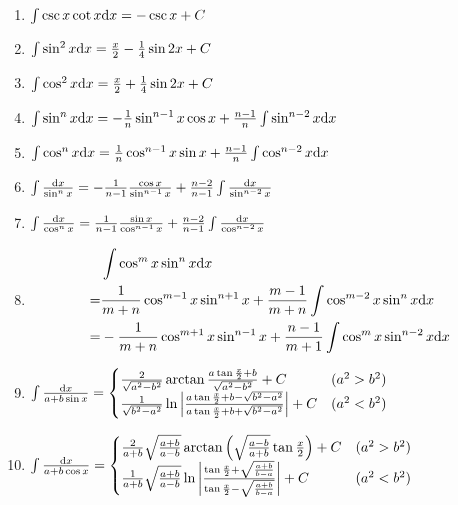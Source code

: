 \begin{footnotesize}
\begin{enumerate}
\item $ \int \csc x \cot x \mathrm{d} x = -\csc x + C $

\item $ \int \sin^2 x \mathrm{d} x = \frac{x}{2} - \frac{1}{4} \sin 2x + C $

\item $ \int \cos^2 x \mathrm{d} x = \frac{x}{2} + \frac{1}{4} \sin 2x + C $

\item $ \int \sin^n x \mathrm{d} x = -\frac{1}{n} \sin^{n-1} x \cos x + \frac{n-1}{n} \int \sin^{n-2} x \mathrm{d} x $

\item $ \int \cos^n x \mathrm{d} x = \frac{1}{n} \cos^{n-1} x \sin x + \frac{n-1}{n} \int \cos^{n-2} x \mathrm{d} x $

\item $ \int \frac{\mathrm{d} x}{\sin^n x} = -\frac{1}{n-1} \frac{\cos x}{\sin^{n-1}x} + \frac{n-2}{n-1} \int \frac{\mathrm{d} x}{\sin^{n-2}x} $

\item $ \int \frac{\mathrm{d} x}{\cos^n x} = \frac{1}{n-1} \frac{\sin x}{\cos^{n-1}x} + \frac{n-2}{n-1} \int \frac{\mathrm{d} x}{\cos^{n-2}x} $

\item \[ \begin{split} {} & \int \cos^m x \sin^n x \mathrm{d} x \\
	= & \frac{1}{m+n} \cos^{m-1} x \sin^{n+1}x + \frac{m-1}{m+n}\int\cos^{m-2}x\sin^nx\mathrm{d} x \\
	= & -\frac{1}{m+n} \cos^{m+1} x \sin^{n-1}x + \frac{n-1}{m+1} \int \cos^m x\sin^{n-2} x \mathrm{d} x \end{split} \]

\item $ \int \frac{\mathrm{d} x}{a + b \sin x} = \begin{cases}
\frac{2}{\sqrt{a^2-b^2}}\arctan\frac{a\tan\frac{x}{2}+b}{\sqrt{a^2-b^2}} + C & (a^2 > b^2) \\
\frac{1}{\sqrt{b^2-a^2}}\ln \left| \frac{a\tan\frac{x}{2}+b-\sqrt{b^2-a^2}}{a\tan\frac{x}{2}+b+\sqrt{b^2-a^2}} \right| + C & (a^2 < b^2)
\end{cases} $

\item $ \int \frac{\mathrm{d} x}{a + b \cos x} = \begin{cases}
\frac{2}{a+b}\sqrt\frac{a+b}{a-b} \arctan\left(\sqrt\frac{a-b}{a+b}\tan\frac{x}{2}\right) + C & (a^2 > b^2) \\
\frac{1}{a+b}\sqrt\frac{a+b}{a-b} \ln \left| \frac{\tan\frac{x}{2}+\sqrt\frac{a+b}{b-a}}{\tan\frac{x}{2}-\sqrt\frac{a+b}{b-a}} \right| + C
& (a^2 < b^2)
\end{cases} $


\end{enumerate}
\end{footnotesize}
